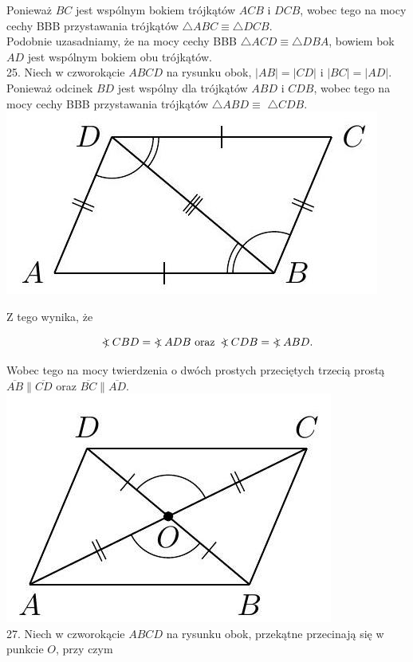 \documentclass[10pt]{article}
\newcommand\Varangle{\mathop{{<\!\!\!\!\!\text{\small)}}\:}\nolimits}
\begin{document}
Ponieważ \(B C\) jest wspólnym bokiem trójkątów \(A C B\) i \(D C B\), wobec tego na mocy cechy BBB przystawania trójkątów \(\triangle A B C \equiv \triangle D C B\).\\
Podobnie uzasadniamy, że na mocy cechy BBB \(\triangle A C D \equiv \triangle D B A\), bowiem bok \(A D\) jest wspólnym bokiem obu trójkątów.\\
25. Niech w czworokącie \(A B C D\) na rysunku obok, \(|A B|=|C D|\) i \(|B C|=|A D|\).\\
Ponieważ odcinek \(B D\) jest wspólny dla trójkątów \(A B D\) i \(C D B\), wobec tego na mocy cechy BBB przystawania trójkątów \(\triangle A B D \equiv\) \(\triangle C D B\).\\
\includegraphics[max width=\textwidth, center]{2024_11_21_71f62bd117d375398909g-066(2)}

Z tego wynika, że

\[
\Varangle C B D=\Varangle A D B \text { oraz } \Varangle C D B=\Varangle A B D .
\]

Wobec tego na mocy twierdzenia o dwóch prostych przeciętych trzecią prostą \(\overline{A B} \| \overline{C D}\) oraz \(\overline{B C} \| \overline{A D}\).\\
\includegraphics[max width=\textwidth, center]{2024_11_21_71f62bd117d375398909g-066(1)}\\
27. Niech w czworokącie \(A B C D\) na rysunku obok, przekątne przecinają się w punkcie \(O\), przy czym
\end{document}
